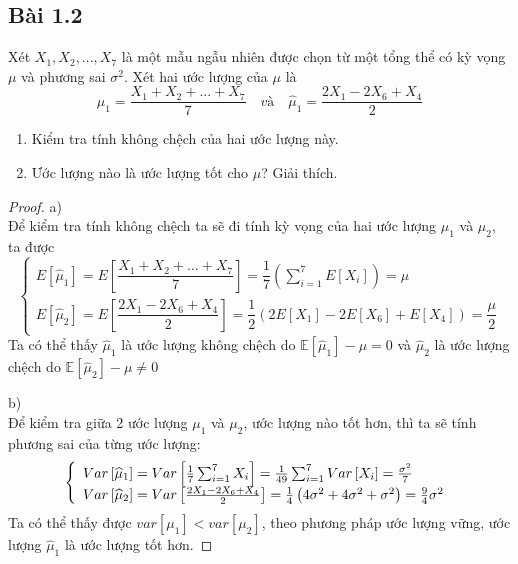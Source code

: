 \newcommand{\N}{\mathbb{N}}
\newcommand{\Z}{\mathbb{Z}}

\subsection{Bài 1.2}

\begin{problem}{1.2}
Xét $X_1,X_2,...,X_7$ là một mẫu ngẫu nhiên được chọn từ một tổng thể có kỳ vọng $\mu$ và phương sai $\sigma^2$. Xét hai ước lượng của $\mu$ là
\[ \hat{\mu}_1 = \dfrac{X_1+X_2+...+X_7}{7} \quad \textit{và} \quad \hat{\mu}_1 = \dfrac{2X_1-2X_6+X_4}{2}\]
\begin{enumerate}[label=(\alph*)]
\item Kiểm tra tính không chệch của hai ước lượng này.
\item Ước lượng nào là ước lượng tốt cho $\mu$? Giải thích.
\end{enumerate}
\end{problem}

\begin{proof}
a)\\
Để kiểm tra tính không chệch ta sẽ đi tính kỳ vọng của hai ước lượng $\mu_1$ và $\mu_2$, ta được
\begin{equation*}
\left\{\begin{array}{l}E\left[{\widehat\mu}_1\right]=E\left[\dfrac{X_1+X_2+...+X_7}7\right]=\dfrac17\left(\sum_{i=1}^7E\left[X_i\right]\right)=\mu\\E\left[{\widehat\mu}_2\right]=E\left[\dfrac{2X_1-2X_6+X_4}2\right]=\dfrac12\left(2E\left[X_1\right]-2E\left[X_6\right]+E\left[X_4\right]\right)=\dfrac\mu2\end{array}\right.
\end{equation*}
Ta có thể thấy $\hat \mu_1$ là ước lượng không chệch do $\mathbb{E}\left[\hat \mu_1 \right] - \mu = 0$ và $\hat \mu_2$ là ước lượng chệch do $\mathbb{E}\left[\hat \mu_2 \right] - \mu \neq 0$

b)\\
Để kiểm tra giữa 2 ước lượng $\mu_1$ và $\mu_2$, ước lượng nào tốt hơn, thì ta sẽ tính phương sai của từng ước lượng:
\begin{equation*}
\left\{\begin{array}{l}Var\left[{\widehat\mu}_1\right]=Var\left[\frac17\sum_{i=1}^7X_i\right]=\frac1{49}\sum_{i=1}^7Var\left[X_i\right]=\frac{\sigma^2}7\\Var\left[{\widehat\mu}_2\right]=Var\left[\frac{2X_1-2X_6+X_4}2\right]=\frac14\left(4\sigma^2+4\sigma^2+\sigma^2\right)=\frac94\sigma^2\end{array}\right.\\
\end{equation*}
Ta có thể thấy được $var[\mu_1] < var[\mu_2]$, theo phương pháp ước lượng vững, ước lượng $\hat \mu_1$ là ước lượng tốt hơn.
\end{proof}